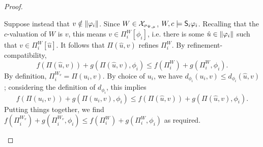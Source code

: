 \begin{proof}
\begin{claimproof}
        Suppose instead that $v \notin \propmods{\phi_i}$. Since $W \in
        \X_{\sigma_{\Psi, \mu}}$, $W, c \models \S_i\phi_i$. Recalling that the
        $c$-valuation of $W$ is $v$, this means $v \in \Pi^W_i[\phi_i]$, i.e.
        there is some $\hat{u} \in \propmods{\phi_i}$ such that $v \in
        \Pi^W_i[\hat{u}]$. It follows that $\Pi(\hat{u}, v)$ refines $\Pi^W_i$.
        By refinement-compatibility,
        \[
            f(\Pi(\hat{u}, v)) + g(\Pi(\hat{u}, v), \phi_i)
            \le
            f(\Pi^W_i) + g(\Pi^W_i, \phi_i).
        \]
        By definition, $\Pi^{W_v}_i = \Pi(u_i, v)$. By choice of $u_i$, we have
        $d_{\phi_i}(u_i, v) \le d_{\phi_i}(\hat{u}, v)$; considering the
        definition of $d_{\phi_i}$, this implies
        \[
            f(\Pi(u_i, v)) + g(\Pi(u_i, v), \phi_i)
            \le
            f(\Pi(\hat{u}, v)) + g(\Pi(\hat{u}, v), \phi_i).
        \]
        Putting things together, we find $f(\Pi^{W_v}_i) + g(\Pi^{W_v}_i,
        \phi_i) \le f(\Pi^W_i) + g(\Pi^W_i, \phi_i)$ as required.
    \end{claimproof}


\end{proof}
